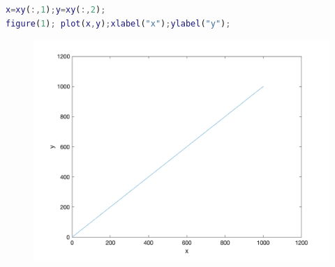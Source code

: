\documentclass[12pt,a4paper]{article}
\begin{document}
\begin{spacing}{1.5}
\begin{lstlisting}[language=matlab]
x=xy(:,1);y=xy(:,2);
figure(1); plot(x,y);xlabel("x");ylabel("y");
\end{lstlisting}
\begin{figure}[htbp]
	\centering
	\includegraphics[scale=0.3]{m3.png}	
\end{figure}


\end{spacing}
\end{document}
